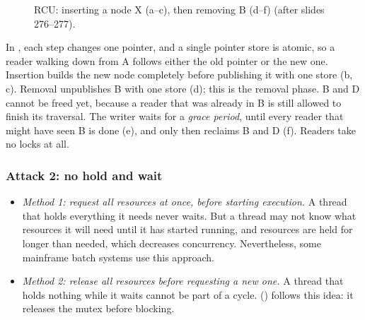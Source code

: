 \begin{figure}[htbp]
\caption{RCU: inserting a node X (a--c), then removing B (d--f) (after slides 276--277).}
\label{fig:rcu}
\end{figure}

In , each step changes one pointer, and a single pointer store is atomic, so a reader walking down from A follows either the old pointer or the new one. Insertion builds the new node completely before publishing it with one store (b, c). Removal unpublishes B with one store (d); this is the removal phase. B and D cannot be freed yet, because a reader that was already in B is still allowed to finish its traversal. The writer waits for a \emph{grace period}, until every reader that might have seen B is done (e), and only then reclaims B and D (f). Readers take no locks at all.

\subsubsection{Attack 2: no hold and wait}
\begin{itemize}
  \item \emph{Method 1: request all resources at once, before starting execution.} A thread that holds everything it needs never waits. But a thread may not know what resources it will need until it has started running, and resources are held for longer than needed, which decreases concurrency. Nevertheless, some mainframe batch systems use this approach.
  \item \emph{Method 2: release all resources before requesting a new one.} A thread that holds nothing while it waits cannot be part of a cycle.  () follows this idea: it releases the mutex before blocking.
\end{itemize}

